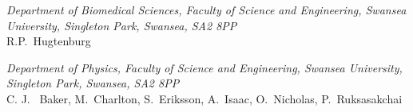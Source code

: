 \vspace{0.5cm}
\noindent \textit{Department of Biomedical Sciences, Faculty of Science and Engineering, Swansea University, Singleton Park, Swansea, SA2 8PP} \\
R.P.~Hugtenburg
 
\vspace{0.5cm}
\noindent \textit{Department of Physics, Faculty of Science and Engineering, Swansea University, Singleton Park, Swansea, SA2 8PP} \\
C. J. ~Baker, M.~Charlton, S.~Eriksson, A.~Isaac, O.~Nicholas, P.~Ruksasakchai
 
\vspace{0.5cm}
